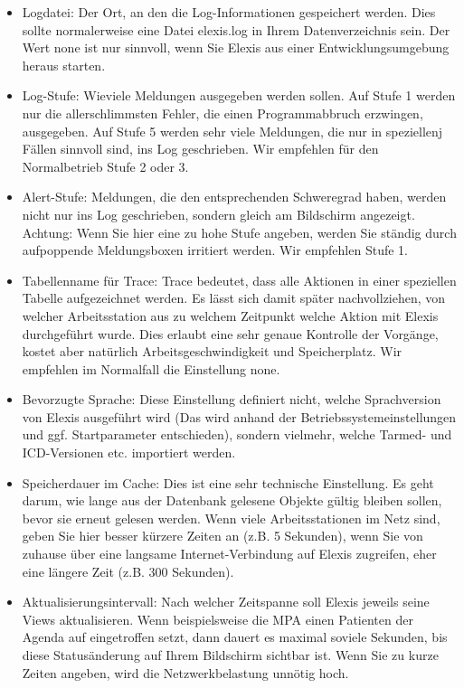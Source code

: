 \begin{itemize}
  \item Logdatei: Der Ort, an den die Log-Informationen gespeichert werden. Dies sollte normalerweise eine Datei \glqq elexis.log\grqq{} in Ihrem
  Datenverzeichnis sein. Der Wert \glqq none\grqq{} ist nur sinnvoll, wenn Sie
  Elexis aus einer Entwicklungsumgebung heraus starten.
  \item Log-Stufe: Wieviele Meldungen ausgegeben werden sollen. Auf Stufe 1
  werden nur die allerschlimmsten Fehler, die einen Programmabbruch erzwingen,
  ausgegeben. Auf Stufe 5 werden sehr viele Meldungen, die nur in speziellenj
  Fällen sinnvoll sind, ins Log geschrieben. Wir empfehlen für den Normalbetrieb
  Stufe 2 oder 3.
  \item Alert-Stufe: Meldungen, die den entsprechenden Schweregrad haben, werden
  nicht nur ins Log geschrieben, sondern gleich am Bildschirm angezeigt.
  Achtung: Wenn Sie hier eine zu hohe Stufe angeben, werden Sie ständig durch
  aufpoppende Meldungsboxen irritiert werden. Wir empfehlen Stufe 1.
  \item Tabellenname für Trace: Trace bedeutet, dass alle Aktionen in einer
  speziellen Tabelle aufgezeichnet werden. Es lässt sich damit später
  nachvollziehen, von welcher Arbeitsstation aus zu welchem Zeitpunkt welche
  Aktion mit Elexis durchgeführt wurde. Dies erlaubt eine sehr genaue Kontrolle
  der Vorgänge, kostet aber natürlich Arbeitsgeschwindigkeit und Speicherplatz.
  Wir empfehlen im Normalfall die Einstellung \glqq none\grqq{}.
  \item Bevorzugte Sprache: Diese Einstellung definiert nicht, welche
  Sprachversion von Elexis ausgeführt wird (Das wird anhand der
  Betriebssystemeinstellungen und ggf. Startparameter entschieden), sondern
  vielmehr, welche Tarmed- und ICD-Versionen etc. importiert werden.
  \item Speicherdauer im Cache: Dies ist eine sehr technische Einstellung. Es
  geht darum, wie lange aus der Datenbank gelesene Objekte gültig bleiben
  sollen, bevor sie erneut gelesen werden. Wenn
  viele Arbeitsstationen im Netz sind, geben Sie hier besser kürzere Zeiten an
  (z.B. 5 Sekunden), wenn Sie von zuhause über eine langsame Internet-Verbindung
  auf Elexis zugreifen, eher eine längere Zeit (z.B. 300 Sekunden).
  \item Aktualisierungsintervall: Nach welcher Zeitspanne soll Elexis jeweils
  seine Views aktualisieren. Wenn beispielsweise die MPA einen Patienten der
  Agenda auf \glqq eingetroffen\grqq{} setzt, dann dauert es maximal soviele
  Sekunden, bis diese Statusänderung auf Ihrem Bildschirm sichtbar ist. Wenn Sie
  zu kurze Zeiten angeben, wird die Netzwerkbelastung unnötig hoch.
\end{itemize}
